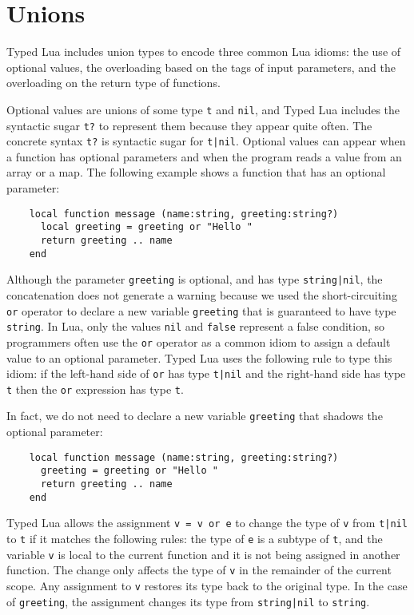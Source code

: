 \section{Unions}
\label{sec:unions}

Typed Lua includes union types to encode three common Lua idioms:
the use of optional values, the overloading based on the tags of
input parameters, and the overloading on the return type of functions.

Optional values are unions of some type \texttt{t} and \texttt{nil},
and Typed Lua includes the syntactic sugar \texttt{t?} to represent
them because they appear quite often.
The concrete syntax \texttt{t?} is syntactic sugar for \texttt{t|nil}.
Optional values can appear when a function has optional parameters
and when the program reads a value from an array or a map.
The following example shows a function that has an optional parameter:
\begin{verbatim}
    local function message (name:string, greeting:string?)
      local greeting = greeting or "Hello "
      return greeting .. name
    end
\end{verbatim}

Although the parameter \texttt{greeting} is optional, and has type
\texttt{string|nil}, the concatenation does not generate a warning
because we used the short-circuiting \texttt{or} operator to declare a
new variable \texttt{greeting} that is guaranteed to have type \texttt{string}. 
In Lua, only the values \texttt{nil} and \texttt{false} represent a
false condition, so programmers often use the \texttt{or} operator as a
common idiom to assign a default value to an optional parameter. 
Typed Lua uses the following rule to type this idiom: 
if the left-hand side of \texttt{or} has type \texttt{t|nil} and
the right-hand side has type \texttt{t} then the \texttt{or} expression has
type \texttt{t}.

In fact, we do not need to declare a new variable \texttt{greeting} that
shadows the optional parameter:
\begin{verbatim}
    local function message (name:string, greeting:string?)
      greeting = greeting or "Hello "
      return greeting .. name
    end
\end{verbatim}

Typed Lua allows the assignment \texttt{v = v or e} to change
the type of \texttt{v} from \texttt{t|nil} to \texttt{t}
if it matches the following rules: 
the type of \texttt{e} is a subtype of \texttt{t},
and the variable \texttt{v} is local to the current function
and it is not being assigned in another function.
The change only affects the type of \texttt{v} in the remainder
of the current scope.
Any assignment to \texttt{v} restores its type back to the
original type.
In the case of \texttt{greeting}, the assignment changes its type
from \texttt{string|nil} to \texttt{string}. 

